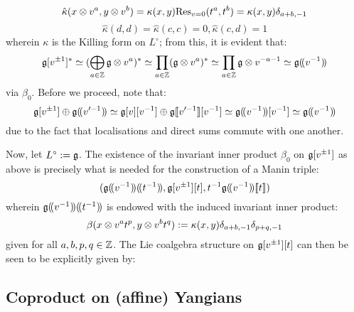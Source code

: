                 $$\hat{\kappa}(x \tensor v^a, y \tensor v^b) = \kappa(x, y) \Res_{v = 0}(t^a, t^b) = \kappa(x, y) \delta_{a + b, -1}$$
                $$\hat{\kappa}(d, d) = \hat{\kappa}(c, c) = 0, \hat{\kappa}(c, d) = 1$$
            wherein $\kappa$ is the Killing form on $L^{\circ}$; from this, it is evident that:
                $$\g[v^{\pm 1}]^* \cong (\bigoplus_{a \in \Z} \g \tensor v^a)^* \cong \prod_{a \in \Z} (\g \tensor v^a)^* \cong \prod_{a \in \Z} \g \tensor v^{-a - 1} \cong \g(\!(v^{-1})\!)$$
            via $\beta_0$. Before we proceed, note that:
                $$\g[v^{\pm 1}] \oplus \g(\!(v'^{-1})\!) \cong \g[v][v^{-1}] \oplus \g[\![v'^{-1}]\!][v^{-1}] \cong \g(\!(v^{-1})\!)[v^{-1}] \cong \g(\!(v^{-1})\!)$$
            due to the fact that localisations and direct sums commute with one another.
            
            Now, let $L^{\circ} := \mathfrak{g}$. The existence of the invariant inner product $\beta_0$ on $\mathfrak{g}[v^{\pm 1}]$ as above is precisely what is needed for the construction of a Manin triple:
                $$( \g(\!(v^{-1})\!)(\!(t^{-1})\!) , \g[v^{\pm 1}][t], t^{-1} \g(\!(v^{-1})\!)[\![t]\!] )$$
            wherein $\mathfrak{g}(\!(v^{-1})\!)(\!(t^{-1})\!)$ is endowed with the induced invariant inner product:
                $$\beta(x \tensor v^a t^p, y \tensor v^b t^q) := \kappa(x, y) \delta_{a + b, -1} \delta_{p + q, -1}$$
            given for all $a, b, p, q \in \mathbb{Z}$. The Lie coalgebra structure on $\mathfrak{g}[v^{\pm 1}][t]$ can then be seen to be explicitly given by:

    \subsection{Coproduct on (affine) Yangians}